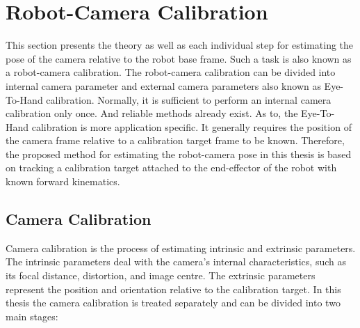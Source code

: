 
\chapter{Robot-Camera Calibration}
\label{chap:robot}
This section presents the theory as well as each individual step for estimating the pose of the camera relative to the robot base frame. Such a task is also known as a robot-camera calibration. The robot-camera calibration can be divided into internal camera parameter and external camera parameters also known as Eye-To-Hand calibration. Normally, it is sufficient to perform an internal camera calibration only once. And reliable methods already exist. As to, the Eye-To-Hand calibration is more application specific. It generally requires the position of the camera frame relative to a calibration target frame to be known. Therefore, the proposed method for estimating the robot-camera pose in this thesis is based on tracking a calibration target attached to the end-effector of the robot with known forward kinematics. 


\section{Camera Calibration}

Camera calibration is the process of estimating intrinsic and extrinsic parameters. The intrinsic parameters deal with the camera's internal characteristics, such as its focal distance, distortion, and image centre. The extrinsic parameters represent the position and orientation relative to the calibration target. In this thesis the camera calibration is treated separately and can be divided into two main stages:

